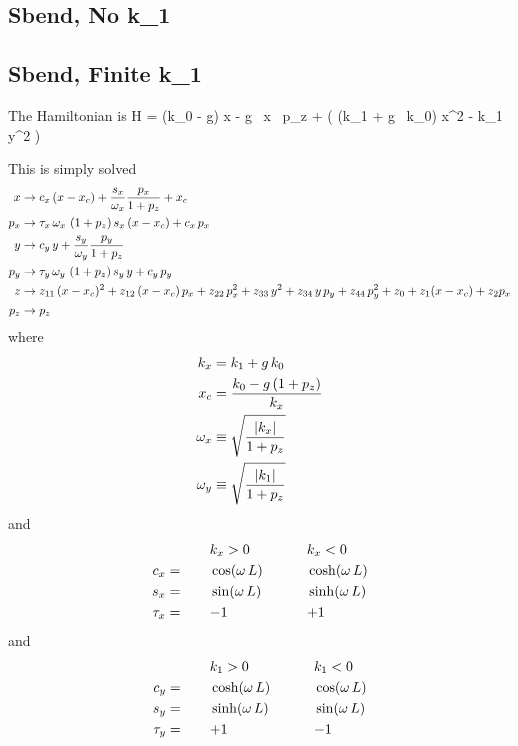 \documentclass{book}
\begin{document}
\subsection{Sbend, No k\_1}



\subsection{Sbend, Finite k\_1}

The Hamiltonian is
\Begineq
  H = (k_0 - g) x - g \, x \, p_z + 
  \left( (k_1 + g \, k_0) x^2 - k_1 \, y^2 \right)
\Endeq

This is simply solved
\begin{align}
  x   &\rightarrow c_x \, (x - x_c) + \frac{s_x}{\omega_x} \frac{p_x}{1 + p_z} + x_c \nonumber \\
  p_x &\rightarrow \tau_x \, \omega_x \, \, (1 + p_z) \, s_x \, (x -x_c) + c_x \, p_x \nonumber \\
  y   &\rightarrow c_y \, y + \frac{s_y}{\omega_y} \frac{p_y}{1 + p_z} \nonumber \\
  p_y &\rightarrow \tau_y \, \omega_y \, \, (1 + p_z) \, s_y \, y + c_y \, p_y \nonumber \\
  z   &\rightarrow z_{11} \, (x-x_c)^2 + z_{12} \, (x-x_c) \, p_x + z_{22} \, p_x^2 + 
                   z_{33} \, y^2 + z_{34} \, y \, p_y + z_{44} \, p_y^2 +
                   z_{0} + z_{1} (x - x_c) + z_{2} p_x \nonumber \\
  p_z &\rightarrow p_z \nonumber
\end{align}
where 
\begin{align}
  k_x &= k_1 + g \, k_0 \nonumber \\
  x_c &= \frac{k_0 - g \, (1 + p_z)}{k_x} \\
  \omega_x &\equiv \sqrt{\frac{|k_x|}{1 + p_z}} \nonumber \\
  \omega_y &\equiv \sqrt{\frac{|k_1|}{1 + p_z}} \nonumber \\
\end{align}
and
\begin{alignat}{3}
         &\hspace*{5ex}  && k_x > 0          &\hspace*{5ex}& k_x < 0 \nonumber \\
     c_x &=   && \cos  (\omega \, L) && \cosh (\omega \, L) \\
     s_x &=   && \sin  (\omega \, L) && \sinh (\omega \, L) \nonumber \\
  \tau_x &=   && {-}1             && {+}1             \nonumber \\
\end{alignat}
and
\begin{alignat}{3}
         &\hspace*{5ex}  && k_1 > 0          &\hspace*{5ex}& k_1 < 0 \nonumber \\
     c_y &=   && \cosh (\omega \, L) && \cos  (\omega \, L) \\
     s_y &=   && \sinh (\omega \, L) && \sin  (\omega \, L) \nonumber \\
  \tau_y &=   && {+}1             && {-}1             \nonumber
\end{alignat}
\end{document}

